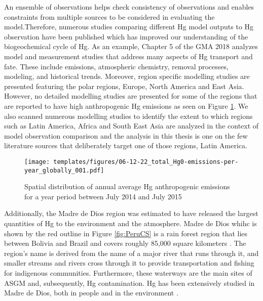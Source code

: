 \begin{flushleft}
An ensemble of observations helps check consistency of observations and enables constraints from multiple sources to be considered in evaluating the model\cite{brasseur_modeling_2017}.Therefore, numerous studies comparing different Hg model outputs to Hg observation have been published which has improved our understanding of the biogeochemical cycle of Hg. As an example, Chapter 5 of the GMA 2018 analyzes model and measurement studies that address many aspects of Hg transport and fate. These include emissions, atmospheric chemistry, removal processes, modeling, and historical trends. Moreover, region specific modelling studies are presented featuring the polar regions, Europe, North America and East Asia. However, no detailed modelling studies are presented for some of the regions that are reported to have high anthropogenic Hg emissions as seen on Figure \ref{fig:world_hg_emisions}. We also scanned numerous modelling studies to identify the extent to which regions such as Latin America, Africa and South East Asia are analyzed in the context of model observation comparison and the analysis in this thesis is one on the few literature sources that deliberately target one of those regions, Latin America. 
\end{flushleft}

\begin{figure}[H]
  \texttt{[image: templates/figures/06-12-22\_total\_Hg0-emissions-per-year\_globally\_001.pdf]}
  \centering
  \caption{Spatial distribution of annual average Hg anthropogenic emissions for a year period between July 2014 and July 2015}
  \label{fig:world_hg_emisions}
\end{figure}
\FloatBarrier


\begin{flushleft}
Additionally, the Madre de Dios region was estimated to have released the largest quantities of Hg to the environment and the atmosphere. Madre de Dios whihc is shown by the red outline in Figure \ref{fig:PeruCS} is a rain forest region that lies between Bolivia and Brazil and covers roughly 85,000 square kilometers . The region's name is derived from the name of a major river that runs through it, and smaller streams and rivers cross through it to provide transportation and fishing for indigenous communities. Furthermore, these waterways are the main sites of ASGM and, subsequently, Hg contamination. Hg has been extensively studied in Madre de Dios, both in people and in the environment \cite{ashe_elevated_2012}\cite{moody_mercury_2020-1}.

\end{flushleft}

